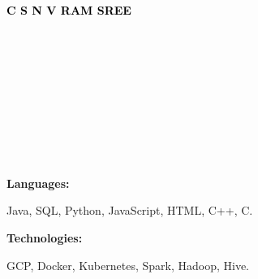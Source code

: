 \documentclass[9pt]{developercv} %
\begin{document}
    
    \begin{minipage}[t]{0.5\textwidth} 
      \vspace{-\baselineskip}

      { \fontsize{16}{20} \textcolor{black}{\textbf{\MakeUppercase{C S N V RAM SREE}}}}

      \vspace{6pt}

      {\Large }
    \end{minipage}
    \hfill
    \begin{minipage}[t]{0.2\textwidth}
      \vspace{-\baselineskip}

      \\ 
      \\
      \\

      \end{minipage}
      \begin{minipage}[t]{0.27\textwidth} %
      \vspace{-\baselineskip} 

      \\	
      \\
      \\    

    \end{minipage}
    
    \begin{minipage}[t]{0.46\textwidth}
	\vspace{-6pt}
 
	\lipsum[1][1-5] \\
\end{minipage}
  \hfill
    \begin{minipage}[t]{0.465\textwidth}
    \vspace{-6pt}
    
    \begin{minipage}[t]{0.2\textwidth}
        \textbf{Languages:}
    \end{minipage}
    \hfill
    \begin{minipage}[t]{0.73\textwidth}
      Java, SQL, Python, JavaScript, HTML, C++, C.  
    \end{minipage}
    \vspace{4mm}
    
    \begin{minipage}[t]{0.2\textwidth}
        \textbf{Technologies:}
    \end{minipage}
    \hfill
    \begin{minipage}[t]{0.73\textwidth}
      GCP, Docker, Kubernetes, Spark, Hadoop, Hive.
    \end{minipage}
    
\end{minipage}
    
\end{document}

